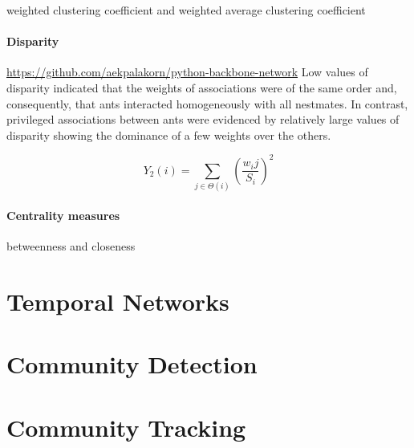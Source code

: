 weighted clustering coefficient and weighted average clustering coefficient~\cite{saramaki2007generalizations}\\

\paragraph*{Disparity}
\url{https://github.com/aekpalakorn/python-backbone-network}
Low values of disparity indicated that the weights of associations were of the same order and, consequently, that ants interacted homogeneously with all nestmates. In contrast, privileged associations between ants were evidenced by relatively large values of disparity showing the dominance of a few weights over the others.~\cite{barthelemy2005characterization}

$$Y_2(i)=\sum_{j\in \Theta(i)} (\frac{w_ij}{S_i})^2$$

\paragraph*{Centrality measures}
betweenness and closeness


\section{Temporal Networks}

\section{Community Detection}

\section{Community Tracking}